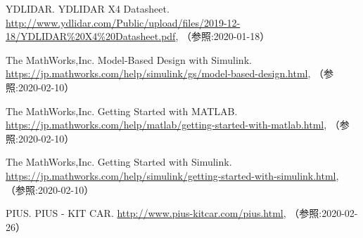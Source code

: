 {\begin{thebibliography}{9}
   YDLIDAR. YDLIDAR X4 Datasheet. \url{http://www.ydlidar.com/Public/upload/files/2019-12-18/YDLIDAR%20X4%20Datasheet.pdf}, （参照:2020-01-18）

   The MathWorks,Inc. Model-Based Design with Simulink. \url{https://jp.mathworks.com/help/simulink/gs/model-based-design.html}, （参照:2020-02-10）

   The MathWorks,Inc. Getting Started with MATLAB. \url{https://jp.mathworks.com/help/matlab/getting-started-with-matlab.html}, （参照:2020-02-10）

   The MathWorks,Inc. Getting Started with Simulink. \url{https://jp.mathworks.com/help/simulink/getting-started-with-simulink.html}, （参照:2020-02-10）

   PIUS. PIUS - KIT CAR. \url{http://www.pius-kitcar.com/pius.html}, （参照:2020-02-26）

\end{thebibliography}
}